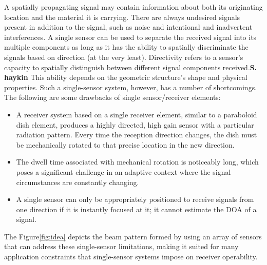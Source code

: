 A spatially propagating signal may contain information about both its originating location and the material it is carrying. There are always undesired signals present in addition to the signal, such as noise and intentional and inadvertent interferences. A
single sensor can be used to separate the received signal into its multiple components as long as it has the ability to spatially discriminate the signals based on direction (at the very least). Directivity refers to a sensor’s capacity to spatially distinguish between different signal components received.\textbf{S. haykin} This ability depends on  the geometric structure’s shape and physical properties. Such a single-sensor system, however, has a number of shortcomings. The following are some drawbacks of single sensor/receiver elements:
\begin{itemize}
\item A receiver system based on a single receiver element, similar to a paraboloid dish element, produces a highly directed, high gain sensor with a particular radiation pattern. Every time the reception direction changes, the dish must be mechanically rotated to that precise location in the new direction.
\item The dwell time associated with mechanical rotation is noticeably long, which poses a significant challenge in an adaptive context where the signal circumstances are constantly changing.
\item A single sensor can only be appropriately positioned to receive signals from one direction if it is instantly focused at it; it cannot estimate the DOA of a signal. 
\end{itemize}
The Figure\ref{fig:idea} depicts the beam pattern formed by using an array of sensors that can address these single-sensor limitations, making it suited for many application constraints that single-sensor systems impose on receiver operability.
